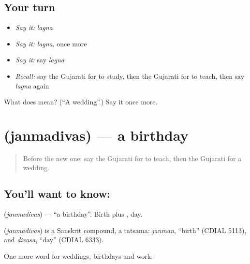 \subsection*{Your turn}
\begin{itemize}
\raggedright
  \item \emph{Say it:} \emph{lagna}
  \item \emph{Say it:} \emph{lagna}, once more
  \item \emph{Say it:} say \emph{lagna}
  \item \emph{Recall:} say the Gujarati for to study, then the Gujarati for to teach, then say \emph{lagna} again
\end{itemize}

\begin{tcolorbox}[breakable,colback=teal!4,colframe=teal!35!black,title={Before you move on}]
What does  mean? (\textquotedblleft{}A wedding\textquotedblright{}.) Say it once more.
\end{tcolorbox}
\section[\texorpdfstring{\gu{જન્મદિવસ} (janmadivas)}{જન્મદિવસ (janmadivas)}]{ (janmadivas) — a birthday}

\label{lesson:GU-C90-birthday}



\begin{quote}
Before the new one: say the Gujarati for to teach, then the Gujarati for a wedding.
\end{quote}

\subsection*{You'll want to know: }
\textbf{} (\emph{janmadivas}) — \textquotedblleft{}a birthday\textquotedblright{}. Birth plus \textbf{}, day.

\begin{cousinweb}
\textbf{} (\emph{janmadivas}) is a Sanskrit compound, a tatsama: \emph{janman}, \textquotedblleft{}birth\textquotedblright{} (CDIAL 5113), and \emph{divasa}, \textquotedblleft{}day\textquotedblright{} (CDIAL 6333).
\end{cousinweb}

\begin{grammarlens}[title={What you've built}]
One more word for weddings, birthdays and work.
\end{grammarlens}

